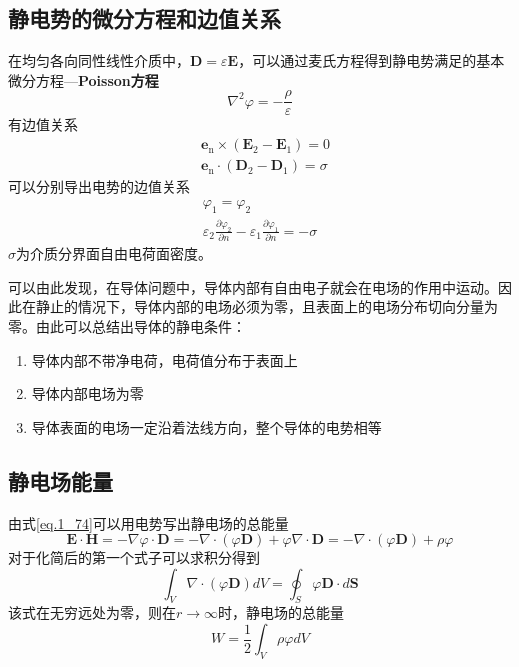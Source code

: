     \subsection{静电势的微分方程和边值关系}
        在均匀各向同性线性介质中，$\boldsymbol{D}= \varepsilon \boldsymbol{E}$，可以通过麦氏方程得到静电势满足的基本微分方程—\textbf{Poisson方程}
        \begin{equation}
            \boxed{\nabla^2 \varphi = - \frac{\rho}{\varepsilon}}
        \end{equation}
        有边值关系
        \begin{equation}
            \begin{aligned}
            &\boldsymbol{e}_{\mathrm{n}} \times\left(\boldsymbol{E}_{2}-\boldsymbol{E}_{1}\right)=0 \\
            &\boldsymbol{e}_{\mathrm{n}} \cdot\left(\boldsymbol{D}_{2}-\boldsymbol{D}_{1}\right)=\sigma
            \end{aligned}
        \end{equation}
        可以分别导出电势的边值关系
        \begin{equation}
            \begin{gathered}
                \varphi_1 = \varphi_2 \\
                \varepsilon_2 \frac{\partial \varphi_2}{\partial n} - \varepsilon_1 \frac{\partial \varphi_1}{\partial n} = -\sigma
            \end{gathered}
        \end{equation}
        $\sigma$为介质分界面自由电荷面密度。
        
        可以由此发现，在导体问题中，导体内部有自由电子就会在电场的作用中运动。因此在静止的情况下，导体内部的电场必须为零，且表面上的电场分布切向分量为零。由此可以总结出导体的静电条件：
        \begin{enumerate}
            \item 导体内部不带净电荷，电荷值分布于表面上
            \item 导体内部电场为零
            \item 导体表面的电场一定沿着法线方向，整个导体的电势相等
        \end{enumerate}
    \subsection{静电场能量}
        由式\ref{eq.1_74}可以用电势写出静电场的总能量\[\boldsymbol{E} \cdot \boldsymbol{H} = -\nabla \varphi \cdot \boldsymbol{D} = - \nabla \cdot (\varphi \boldsymbol{D}) + \varphi \nabla \cdot \boldsymbol{D}= -\nabla \cdot (\varphi \boldsymbol{D}) + \rho \varphi\]对于化简后的第一个式子可以求积分得到\[\int_V \nabla \cdot (\varphi \boldsymbol{D})dV = \oint_S \varphi \boldsymbol{D} \cdot d\boldsymbol{S}\]该式在无穷远处为零，则在$r \to \infty$时，静电场的总能量
        \begin{equation}
            W = \frac{1}{2} \int_V \rho \varphi dV
        \end{equation}
